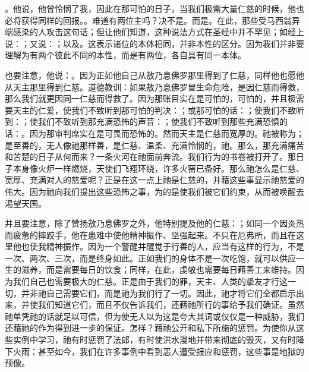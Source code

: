 。他说，他曾怜悯了我，因此在那可怕的日子，当我们极需大量仁慈的时候，他也必将获得同样的回报。。难道有两位主吗？决不是。而是。在此，那些受马西翁异端感染的人攻击这句话；但让他们知道，这种说法方式在圣经中并不罕见；如经上说：；又说：；以及。这表示诸位的本体相同，并非本性的区分。因为我们并非要理解为有两个彼此不同的本性，而是有两位，各自具有同一本体。\par

也要注意，他说：。因为正如他自己从敖乃息佛罗那里得到了仁慈，同样他也愿他从天主那里得到仁慈。道德教训：如果敖乃息佛罗冒生命危险，是因仁慈而得救，那么我们就更因同一仁慈而得救了。因为那账目实在是可怕的，可怕的，并且极需要天主的仁爱，使我们不致听到那可怕的判决：；或那可怕的话：；使我们不致听到：；使我们不致听到那充满恐怖的声音：；使我们不致听到那些充满恐惧的话：。因为那审判席实在是可畏而恐怖的。然而天主是仁慈而宽厚的。祂被称为；是至善的，无人像祂那样善，是仁慈、温柔、充满怜悯的，祂。那么，那充满痛苦和苦楚的日子从何而来？一条火河在祂面前奔流。我们行为的书卷被打开了。那日子本身像火炉一样燃烧，天使们飞翔环绕，许多火窑已备好。那么祂怎么是仁慈、宽厚、充满对人的慈爱呢？正是在这一点上祂是仁慈的，并藉这些事显示祂慈爱的伟大。因为祂向我们提出这些恐怖之事，为的是使我们被它们约束，从而被唤醒去渴望天国。\par

并且要注意，除了赞扬敖乃息佛罗之外，他特别提及他的仁慈：；如同一个因炎热而疲惫的摔跤手，他在患难中使他精神振作、坚强起来。\newline{}不只在厄弗所，而且在这里他也使我精神振作。因为一个警醒并醒觉于行善的人，应当有这样的行为，不是一次、两次、三次，而是终身如此。正如我们的身体不是一次吃饱，就可以供应一生的滋养，而是需要每日的饮食；同样，在此，虔敬也需要每日藉善工来维持。因为我们自己也需要极大的仁慈。正是由于我们的罪，天主、人类的挚友才行这一切，并非祂自己需要它们，而是祂为我们行了一切。因此，祂才将它们全都启示出来，并使我们知道它们，而且不仅告诉我们，还藉祂所行的事给予我们确证。虽然祂单凭祂的话就足以可信，但为使无人以为这是夸大其词或仅仅是一种威胁，我们还藉祂的作为得到进一步的保证。怎样？藉祂公开和私下所施的惩罚。为使你从这些实例中学习，祂有时惩罚了法郎，有时使洪水漫地并带来彻底的毁灭，又有时降下火雨：甚至如今，我们在许多事例中看到恶人遭受报应和惩罚，这些事是地狱的预像。\par

